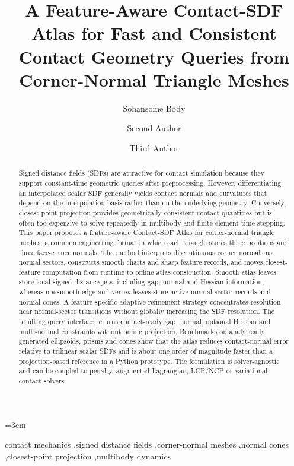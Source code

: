 \documentclass[preprint,12pt,sort&compress]{elsarticle}
\begin{document}
\emergencystretch=3em

\begin{frontmatter}

\title{A Feature-Aware Contact-SDF Atlas for Fast and Consistent Contact Geometry Queries from Corner-Normal Triangle Meshes}

\author[inst1]{Sohansome Body}
\author[inst1]{Second Author}
\author[inst2]{Third Author}

\address[inst1]{Department of Mechanical Engineering, Institution, City, Country}
\address[inst2]{Department of Computational Mechanics, Institution, City, Country}

\begin{abstract}
Signed distance fields (SDFs) are attractive for contact simulation because they support constant-time geometric queries after preprocessing. However, differentiating an interpolated scalar SDF generally yields contact normals and curvatures that depend on the interpolation basis rather than on the underlying geometry. Conversely, closest-point projection provides geometrically consistent contact quantities but is often too expensive to solve repeatedly in multibody and finite element time stepping. This paper proposes a feature-aware Contact-SDF Atlas for corner-normal triangle meshes, a common engineering format in which each triangle stores three positions and three face-corner normals. The method interprets discontinuous corner normals as normal sectors, constructs smooth charts and sharp feature records, and moves closest-feature computation from runtime to offline atlas construction. Smooth atlas leaves store local signed-distance jets, including gap, normal and Hessian information, whereas nonsmooth edge and vertex leaves store active normal-sector records and normal cones. A feature-specific adaptive refinement strategy concentrates resolution near normal-sector transitions without globally increasing the SDF resolution. The resulting query interface returns contact-ready gap, normal, optional Hessian and multi-normal constraints without online projection. Benchmarks on analytically generated ellipsoids, prisms and cones show that the atlas reduces contact-normal error relative to trilinear scalar SDFs and is about one order of magnitude faster than a projection-based reference in a Python prototype. The formulation is solver-agnostic and can be coupled to penalty, augmented-Lagrangian, LCP/NCP or variational contact solvers.
\end{abstract}

\begin{keyword}
contact mechanics \sep signed distance fields \sep corner-normal meshes \sep normal cones \sep closest-point projection \sep multibody dynamics
\end{keyword}

\end{frontmatter}
\end{document}
